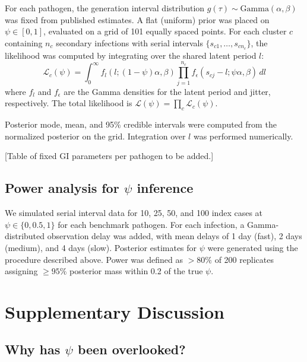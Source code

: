 \documentclass[10pt]{article}
\begin{document}
For each pathogen, the generation interval distribution $g(\tau) \sim \text{Gamma}(\alpha, \beta)$ was fixed from published estimates. A flat (uniform) prior was placed on $\psi \in [0,1]$, evaluated on a grid of 101 equally spaced points. For each cluster $c$ containing $n_c$ secondary infections with serial intervals $\{s_{c1}, \ldots, s_{cn_c}\}$, the likelihood was computed by integrating over the shared latent period $l$:
\begin{equation}
	\mathcal{L}_c(\psi) = \int_0^\infty f_l(l; (1-\psi)\alpha, \beta) \prod_{j=1}^{n_c} f_\epsilon(s_{cj} - l; \psi\alpha, \beta) \, dl
\end{equation}
where $f_l$ and $f_\epsilon$ are the Gamma densities for the latent period and jitter, respectively. The total likelihood is $\mathcal{L}(\psi) = \prod_c \mathcal{L}_c(\psi)$.

Posterior mode, mean, and 95\% credible intervals were computed from the normalized posterior on the grid. Integration over $l$ was performed numerically.

[Table of fixed GI parameters per pathogen to be added.]


\subsection{Power analysis for $\psi$ inference}
\label{sec:supp_power}

We simulated serial interval data for 10, 25, 50, and 100 index cases at $\psi \in \{0, 0.5, 1\}$ for each benchmark pathogen. For each infection, a Gamma-distributed observation delay was added, with mean delays of 1 day (fast), 2 days (medium), and 4 days (slow). Posterior estimates for $\psi$ were generated using the procedure described above. Power was defined as $>80\%$ of 200 replicates assigning $\geq 95\%$ posterior mass within 0.2 of the true $\psi$.


\section{Supplementary Discussion}
\label{sec:supp_discussion}

\subsection{Why has $\psi$ been overlooked?}
\end{document}
